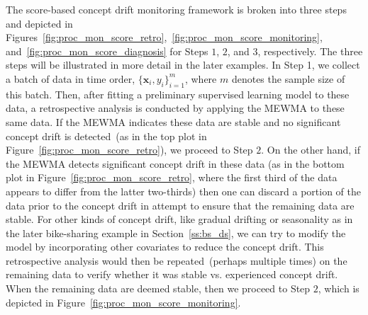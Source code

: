 \documentclass[twoside,11pt]{article}
\begin{document}
The score-based concept drift monitoring framework is broken into three steps and depicted in Figures~\ref{fig:proc_mon_score_retro},~\ref{fig:proc_mon_score_monitoring}, and~\ref{fig:proc_mon_score_diagnosis} for Steps $1$, $2$, and $3$, respectively. The three steps will be illustrated in more detail in the later examples. In Step 1, we collect a batch of data in time order, $\{\bm {x}_i, y_i\} _{i=1} ^{m}$, where $m$ denotes the sample size of this batch. Then, after fitting a preliminary supervised learning model to these data, a retrospective analysis is conducted by applying the MEWMA to these same data. If the MEWMA indicates these data are stable and no significant concept drift is detected~(as in the top plot in Figure~\ref{fig:proc_mon_score_retro}), we proceed to Step $2$. On the other hand, if the MEWMA detects significant concept drift in these data (as in the bottom plot in Figure~\ref{fig:proc_mon_score_retro}, where the first third of the data appears to differ from the latter two-thirds) then one can discard a portion of the data prior to the concept drift in attempt to ensure that the remaining data are stable. For other kinds of concept drift, like gradual drifting or seasonality as in the later bike-sharing example in Section~\ref{ss:bs_ds}, we can try to modify the model by incorporating other covariates to reduce the concept drift. This retrospective analysis would then be repeated~(perhaps multiple times) on the remaining data to verify whether it was stable vs. experienced concept drift. When the remaining data are deemed stable, then we proceed to Step $2$, which is depicted in Figure~\ref{fig:proc_mon_score_monitoring}.
\end{document}

